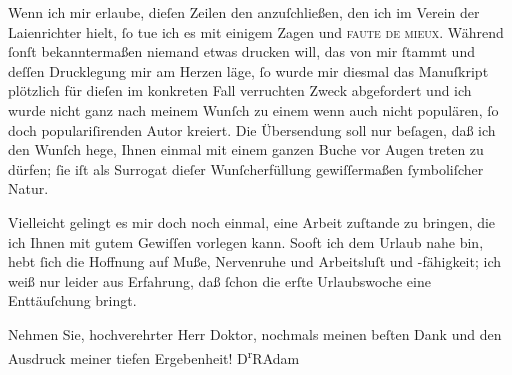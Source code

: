 \pstart
           Wenn ich mir erlaube, dieſen Zeilen den \label{K_L02514-1v}\label{K_L02514-1} anzuſchließen, den ich im Verein der Laienrichter hielt, ſo tue ich es mit einigem Zagen und \textsc{faute de mieux}. Während ſonſt bekanntermaßen niemand etwas
               drucken will, das von mir ſtammt und deſſen Drucklegung mir am Herzen läge, ſo wurde
               mir diesmal das Manuſkript plötzlich für dieſen im konkreten Fall verruchten Zweck
               abgefordert und ich wurde nicht ganz nach meinem Wunſch zu einem wenn auch nicht
               populären, ſo doch populariſirenden Autor kreiert. Die Übersendung soll nur beſagen,
               daß ich den Wunſch hege, Ihnen einmal mit einem ganzen Buche {\pb}vor Augen treten zu dürfen; ſie iſt als
               Surrogat dieſer Wunſcherfüllung gewiſſermaßen ſymboliſcher Natur.\pend
           
\pstart
           Vielleicht gelingt es mir doch noch einmal, eine Arbeit zuſtande zu bringen, die ich
               Ihnen mit gutem Gewiſſen vorlegen kann. Sooft ich dem Urlaub nahe bin, hebt ſich die
               Hoffnung auf Muße, Nervenruhe und Arbeitsluſt und -fähigkeit; ich weiß nur leider aus
               Erfahrung, daß ſchon die erſte Urlaubswoche eine Enttäuſchung bringt.\pend
           
\pstart
           Nehmen Sie, hochverehrter Herr Doktor, nochmals meinen beſten Dank und den Ausdruck
               meiner tiefen Ergebenheit!\pend
           \pstart \spacefill\mbox{D\textsuperscript{r}RAdam}\pend{}\endnumbering{}  
      